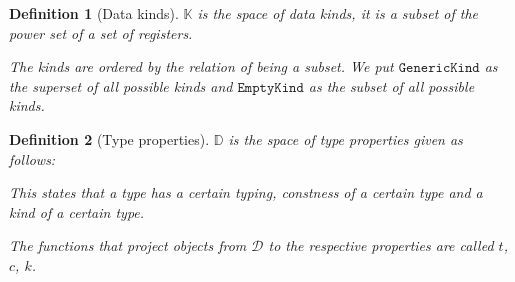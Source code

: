 \documentclass[12pt,a4paper]{article}
\newtheorem{definition}{Definition}
\begin{document}
\begin{definition}[Data kinds]
    $\mathbb{K}$ is the space of data kinds, it is a subset of the power set of a set of registers.

    The kinds are ordered by the relation of being a subset. We put $\mathtt{GenericKind}$ as the superset of all possible kinds and $\mathtt{EmptyKind}$ as the subset of all possible kinds.
\end{definition}

\begin{definition}[Type properties]
    $\mathbb{D}$ is the space of type properties given as follows:
    \begin{algorithmic}
    \end{algorithmic}

    This states that a type has a certain typing, constness of a certain type and a kind of a certain type.

    The functions that project objects from $\mathcal{D}$ to the respective properties are called $t$, $c$, $k$.
\end{definition}
\end{document}
